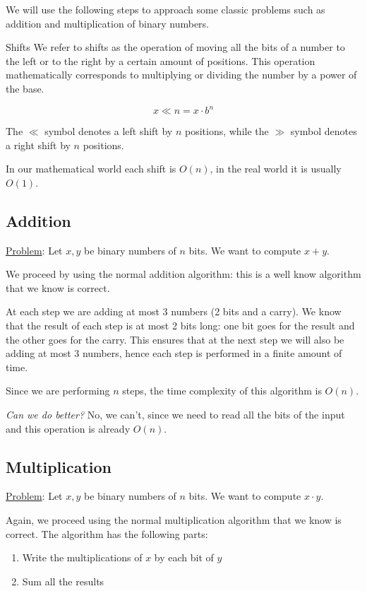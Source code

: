 \documentclass[10pt]{extarticle}
\begin{document}
We will use the following steps to approach some classic problems such as addition and multiplication of binary numbers.

\begin{notebox}{Shifts}
    We refer to shifts as the operation of moving all the bits of a number to the left or to the right by a certain amount of positions.
    This operation mathematically corresponds to multiplying or dividing the number by a power of the base.

    $$
        x \ll n = x \cdot b^n
    $$

    The $\ll$ symbol denotes a left shift by $n$ positions, while the $\gg$ symbol denotes a right shift by $n$ positions.

    In our mathematical world each shift is $O(n)$, in the real world it is usually $O(1)$.
\end{notebox}

\subsection{Addition}

\underline{Problem}: Let $x, y$ be binary numbers of $n$ bits. We want to compute $x + y$.

We proceed by using the normal addition algorithm: this is a well know algorithm that we know is correct.

At each step we are adding at most 3 numbers (2 bits and a carry).
We know that the result of each step is at most 2 bits long: one bit goes for the result and the other goes for the carry.
This ensures that at the next step we will also be adding at most 3 numbers, hence each step is performed in a finite amount of time.

Since we are performing $n$ steps, the time complexity of this algorithm is $O(n)$.

\textit{Can we do better?} No, we can't, since we need to read all the bits of the input and this operation is already $O(n)$.

\subsection{Multiplication}

\underline{Problem}: Let $x, y$ be binary numbers of $n$ bits. We want to compute $x \cdot y$.

Again, we proceed using the normal multiplication algorithm that we know is correct.
The algorithm has the following parts:
\begin{enumerate}
    \item Write the multiplications of $x$ by each bit of $y$
    \item Sum all the results
\end{enumerate}
\end{document}
